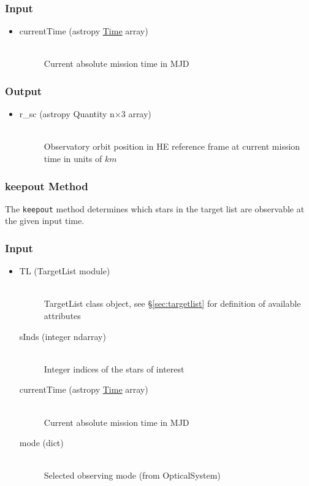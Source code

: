 \documentclass[cleanfoot]{asme2ej}
\begin{document}
\subsubsection*{Input}
\begin{itemize}
\item
\begin{description}
    \item[currentTime (astropy \href{http://astropy.readthedocs.org/en/latest/time/index.html}{Time} array)] \hfill \\ Current absolute mission time in MJD
\end{description}
\end{itemize}
\subsubsection*{Output}
\begin{itemize}
\item
\begin{description}
    \item[r\_sc (astropy Quantity n$\times$3 array)] \hfill \\ Observatory orbit position in HE reference frame at current mission time in units of $ km $
\end{description}
\end{itemize}

\subsubsection{keepout Method} \label{sec:keepouttask} 
The \verb+keepout+ method determines which stars in the target list are observable at the given input time.
\subsubsection*{Input}
\begin{itemize}
\item
\begin{description}
    \item[TL (TargetList module)] \hfill \\ TargetList class object, see \S\ref{sec:targetlist} for definition of available attributes
    \item[sInds (integer ndarray)] \hfill \\ Integer indices of the stars of interest
    \item[currentTime (astropy \href{http://astropy.readthedocs.org/en/latest/time/index.html}{Time} array)] \hfill \\ Current absolute mission time in MJD
    \item[mode (dict)] \hfill \\ Selected observing mode (from OpticalSystem)
\end{description}
\end{itemize}
\end{document}
